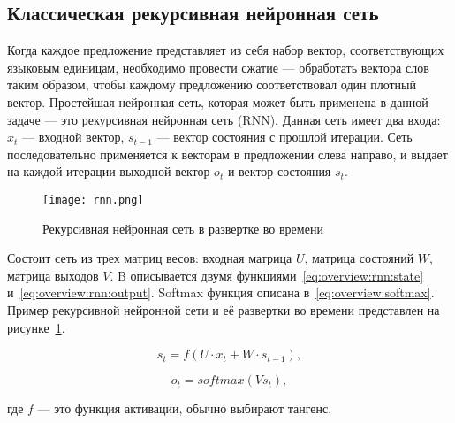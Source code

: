 \subsection{Классическая рекурсивная нейронная сеть}\label{subsec:overview:rnn}
Когда каждое предложение представляет из себя набор вектор, соответствующих языковым единицам, необходимо провести сжатие --- обработать вектора слов таким образом, чтобы каждому предложению соответствовал один плотный вектор. Простейшая нейронная сеть, которая может быть применена в данной задаче --- это рекурсивная нейронная сеть (RNN). Данная сеть имеет два входа: $x_{t}$ --- входной вектор, $s_{t-1}$ --- вектор состояния с прошлой итерации. Сеть последовательно применяется к векторам в предложении слева направо, и выдает на каждой итерации выходной вектор $o_{t}$ и вектор состояния $s_t$.

\begin{figure}[h]
  \begin{center}
    \texttt{[image: rnn.png]}
    \caption{Рекурсивная нейронная сеть в развертке во времени}\label{fig:overview:rnn}
  \end{center}
\end{figure}

Состоит сеть из трех матриц весов: входная матрица $U$, матрица состояний $W$, матрица выходов $V$. B описывается двумя функциями~\ref{eq:overview:rnn:state} и~\ref{eq:overview:rnn:output}. Softmax функция описана в~\ref{eq:overview:softmax}. Пример рекурсивной нейронной сети и её развертки во времени представлен на рисунке~\ref{fig:overview:rnn}.

\begin{equation}
  \label{eq:overview:rnn:state}
  s_t = f(U\cdot{x_t} + W\cdot{s_{t-1}}),
\end{equation}

\begin{equation}
  \label{eq:overview:rnn:output}
  o_t = softmax(Vs_t),
\end{equation}
\begin{explanationx}
\item [где] $f$ --- это функция активации, обычно выбирают тангенс.
\end{explanationx}

